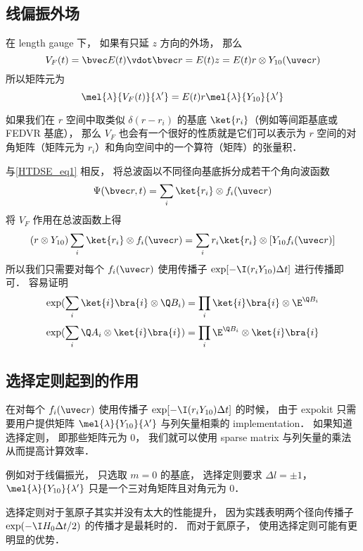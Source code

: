 \subsection{线偏振外场}
在 length gauge 下， 如果有只延 $z$ 方向的外场， 那么
\begin{equation}
V_F(t) = \bvec E(t) \vdot \bvec r =  E(t) z = E(t) r \otimes Y_{10}(\uvec r)
\end{equation}
所以矩阵元为
\begin{equation}
\mel{\lambda}{V_F(t)}{\lambda'} =  E(t) r \mel{\lambda}{Y_{10}}{\lambda'}
\end{equation}

如果我们在 $r$ 空间中取类似 $\delta(r - r_i)$ 的基底 $\ket{r_i}$（例如等间距基底或 FEDVR 基底）， 那么 $V_F$ 也会有一个很好的性质就是它们可以表示为 $r$ 空间的对角矩阵（矩阵元为 $r_i$）和角向空间中的一个算符（矩阵）的张量积． 

与\autoref{HTDSE_eq1} 相反， 将总波函以不同径向基底拆分成若干个角向波函数
\begin{equation}
\Psi(\bvec r, t) = \sum_i \ket{r_i} \otimes f_i(\uvec r)
\end{equation}
将 $V_F$ 作用在总波函数上得
\begin{equation}
(r \otimes Y_{10})\sum_i \ket{r_i} \otimes f_i(\uvec r)
= \sum_i r_i\ket{r_i} \otimes [Y_{10} f_i(\uvec r)]
\end{equation}
所以我们只需要对每个 $f_i(\uvec r)$ 使用传播子 $\exp[-\I (r_i Y_{10}) \Delta t]$ 进行传播即可． 容易证明%
\begin{equation}
\exp(\sum_i \ket{i}\bra{i} \otimes \Q B_i) = \prod_i \ket{i}\bra{i} \otimes  \E^{\Q B_i}
\end{equation}
\begin{equation}
\exp(\sum_i  \Q A_i \otimes \ket{i}\bra{i}) = \prod_i  \E^{\Q B_i} \otimes \ket{i}\bra{i}
\end{equation}

\subsection{选择定则起到的作用}
在对每个 $f_i(\uvec r)$ 使用传播子 $\exp[-\I (r_i Y_{10}) \Delta t]$ 的时候， 由于 expokit 只需要用户提供矩阵 $\mel{\lambda}{Y_{10}}{\lambda'}$ 与列矢量相乘的 implementation． 如果知道选择定则， 即那些矩阵元为 0， 我们就可以使用 sparse matrix 与列矢量的乘法从而提高计算效率．

例如对于线偏振光， 只选取 $m = 0$ 的基底， 选择定则要求 $\Delta l = \pm 1$， $\mel{\lambda}{Y_{10}}{\lambda'}$ 只是一个三对角矩阵且对角元为 0．

选择定则对于氢原子其实并没有太大的性能提升， 因为实践表明两个径向传播子 $\exp(-\I H_0 \Delta t/2)$ 的传播才是最耗时的． 而对于氦原子， 使用选择定则可能有更明显的优势．
